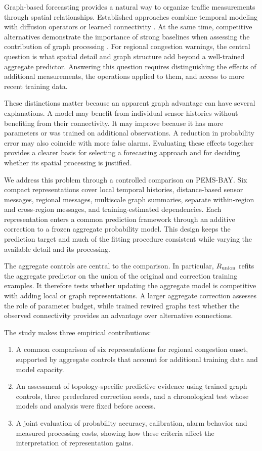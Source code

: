 \documentclass{llncs}
\begin{document}
Graph-based forecasting provides a natural way to organize traffic measurements through spatial relationships. Established approaches combine temporal modeling with diffusion operators or learned connectivity \cite{dcrnn,gwnet}. At the same time, competitive alternatives demonstrate the importance of strong baselines when assessing the contribution of graph processing \cite{simst,stid}. For regional congestion warnings, the central question is what spatial detail and graph structure add beyond a well-trained aggregate predictor. Answering this question requires distinguishing the effects of additional measurements, the operations applied to them, and access to more recent training data.

These distinctions matter because an apparent graph advantage can have several explanations. A model may benefit from individual sensor histories without benefiting from their connectivity. It may improve because it has more parameters or was trained on additional observations. A reduction in probability error may also coincide with more false alarms. Evaluating these effects together provides a clearer basis for selecting a forecasting approach and for deciding whether its spatial processing is justified.

We address this problem through a controlled comparison on PEMS-BAY. Six compact representations cover local temporal histories, distance-based sensor messages, regional messages, multiscale graph summaries, separate within-region and cross-region messages, and training-estimated dependencies. Each representation enters a common prediction framework through an additive correction to a frozen aggregate probability model. This design keeps the prediction target and much of the fitting procedure consistent while varying the available detail and its processing.

The aggregate controls are central to the comparison. In particular, $R_{\rm union}$ refits the aggregate predictor on the union of the original and correction training examples. It therefore tests whether updating the aggregate model is competitive with adding local or graph representations. A larger aggregate correction assesses the role of parameter budget, while trained rewired graphs test whether the observed connectivity provides an advantage over alternative connections.

The study makes three empirical contributions:
\begin{enumerate}
    \item A common comparison of six representations for regional congestion onset, supported by aggregate controls that account for additional training data and model capacity.
    \item An assessment of topology-specific predictive evidence using trained graph controls, three predeclared correction seeds, and a chronological test whose models and analysis were fixed before access.
    \item A joint evaluation of probability accuracy, calibration, alarm behavior and measured processing costs, showing how these criteria affect the interpretation of representation gains.
\end{enumerate}
\end{document}
